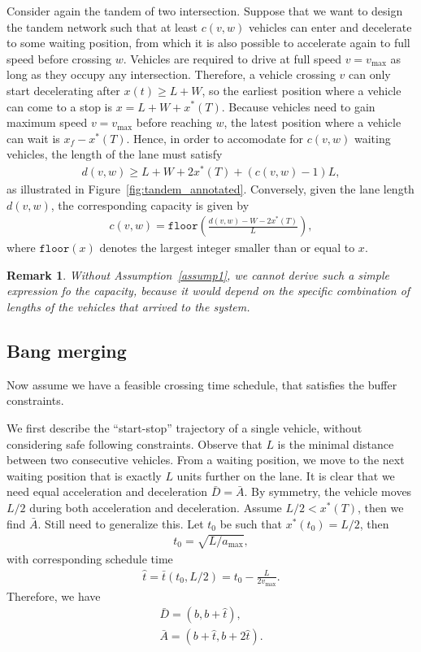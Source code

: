 \documentclass[a4paper]{article}
\theoremstyle{definition}
\theoremstyle{plain}
\newtheorem{remark}{Remark}
\begin{document}
Consider again the tandem of two intersection.
%
Suppose that we want to design the tandem network such that at least $c(v,w)$
vehicles can enter and decelerate to some waiting position, from which it is
also possible to accelerate again to full speed before crossing $w$.
%
Vehicles are required to drive at full speed $v=v_{\max}$ as long as they occupy
any intersection. Therefore, a vehicle crossing $v$ can only start decelerating
after $x(t) \geq L + W$, so the earliest position where a vehicle can come to a
stop is $x = L + W + x^{*}(T)$.
%
Because vehicles need to gain maximum speed $v=v_{\max}$ before reaching $w$,
the latest position where a vehicle can wait is $x_{f} - x^{*}(T)$.
%
Hence, in order to accomodate for $c(v,w)$ waiting vehicles, the length of the
lane must satisfy
\begin{align}
  d(v, w) \geq L + W + 2x^{*}(T) + (c(v,w) - 1) L ,
\end{align}
as illustrated in Figure~\ref{fig:tandem_annotated}.
%
Conversely, given the lane length $d(v,w)$, the corresponding capacity is given
by
\begin{align}
  c(v, w) = \texttt{floor}\left( \frac{d(v,w) - W - 2 x^{*}(T)}{L} \right) ,
\end{align}
where $\texttt{floor}(x)$ denotes the largest integer smaller than or equal to $x$.

\begin{remark}
  Without Assumption~\ref{assump1}, we cannot derive such a simple expression fo
  the capacity, because it would depend on the specific combination of lengths
  of the vehicles that arrived to the system.
\end{remark}


\subsection*{Bang merging}

Now assume we have a feasible crossing time schedule, that satisfies the buffer constraints.

We first describe the ``start-stop'' trajectory of a single vehicle, without
considering safe following constraints.
%
Observe that $L$ is the minimal distance between two consecutive vehicles. From
a waiting position, we move to the next waiting position that is exactly $L$
units further on the lane. It is clear that we need equal acceleration and
deceleration $\bar{D}=\bar{A}$. By symmetry, the vehicle moves $L/2$ during both
acceleration and deceleration.
%
Assume $L/2 < x^{*}(T)$, then we find $\bar{A}$.
{\color{blue} Still need to generalize this.}
Let $t_{0}$ be such that $x^{*}(t_{0}) = L/2$, then
\begin{align*}
t_{0} = \sqrt{L / a_{\max}} ,
\end{align*}
with corresponding schedule time
\begin{align*}
  \hat{t} = \bar{t}(t_{0}, L/2) = t_{0} - \frac{L}{2 v_{\max}} .
\end{align*}
Therefore, we have
\begin{align*}
  \bar{D} = (b, b + \hat{t}) , \\
  \bar{A} = (b + \hat{t}, b + 2 \hat{t}) .
\end{align*}
\end{document}
